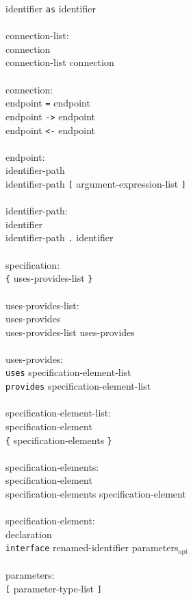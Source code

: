 \documentclass[11pt,letterpaper]{article}
\newcommand{\kw}[1]{{\tt #1}}
\newcommand{\opt}{$_{\mbox{opt}}$\xspace}
\begin{document}
\begin{tabbing}
\>	identifier \kw{as} identifier\\
\\
connection-list:\\
\>	connection\\
\>	connection-list connection\\
\\
connection:\\
\>	endpoint \kw{=} endpoint\\
\>	endpoint \kw{->} endpoint\\
\>	endpoint \kw{<-} endpoint\\
\\
endpoint:\\
\>	identifier-path \\
\>	identifier-path \kw{[} argument-expression-list \kw{]}\\
\\
identifier-path:\\
\>	identifier\\
\>	identifier-path \kw{.} identifier\\
\\
specification:\\
\>	\kw{\{} uses-provides-list \kw{\}}\\
\\
uses-provides-list:\\
\>	uses-provides\\
\>	uses-provides-list uses-provides\\
\\
uses-provides:\\
\>	\kw{uses} specification-element-list\\
\>	\kw{provides} specification-element-list\\
\\
specification-element-list:\\
\>	specification-element\\
\>	\kw{\{} specification-elements \kw{\}}\\
\\
specification-elements:\\
\>	specification-element\\
\>	specification-elements specification-element\\
\\
specification-element:\\
\>	declaration\\
\>	\kw{interface} renamed-identifier parameters\opt\\
\\
parameters:\\
\>	\kw{[} parameter-type-list \kw{]}
\end{tabbing} \rm
\end{document}

